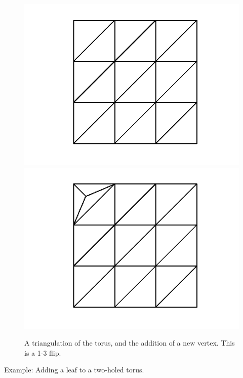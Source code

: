 \documentclass[12pt]{article}
\begin{document}
\begin{figure}
\includegraphics[scale = 0.5]{torus22.png}
\includegraphics[scale = 0.5]{torus2addvertex2.png}
\caption{A triangulation of the torus, and the addition of a new vertex. This is a 1-3 flip.}
\label{torusaddv}
\end{figure}

\noindent Example: Adding a leaf to a two-holed torus.\newline
\end{document}
